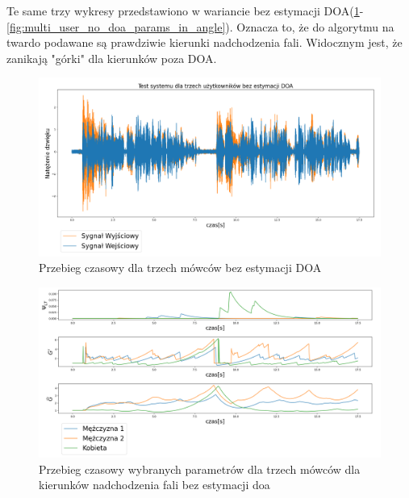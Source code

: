 \noindent Te same trzy wykresy przedstawiono w wariancie bez estymacji DOA(\ref{fig:multi_user_no_doa}-\ref{fig:multi_user_no_doa_params_in_angle}). Oznacza to, że do algorytmu na twardo podawane są prawdziwie kierunki nadchodzenia fali. Widocznym jest, że zanikają "górki" dla kierunków poza DOA.

\begin{figure}[h]
    \centering
    \includegraphics[width=\textwidth]{Images/multi_user_no_doa.png}
    \caption{Przebieg czasowy dla trzech mówców bez estymacji DOA}
    \label{fig:multi_user_no_doa}
\end{figure}

\begin{figure}[h]
    \centering
    \includegraphics[width=\textwidth]{Images/multi_user_params_in_time.png}
    \caption{Przebieg czasowy wybranych parametrów dla trzech mówców dla kierunków nadchodzenia fali bez estymacji doa}
    \label{fig:multi_user_no_doa_params_in_time}
\end{figure}

